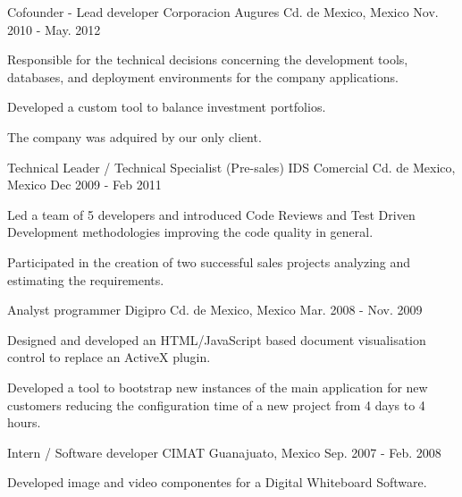 \begin{cventries}
  \cventry
    {Cofounder - Lead developer} %
    {Corporacion Augures} %
    {Cd. de Mexico, Mexico} %
    {Nov. 2010 - May. 2012} %
    {}
    {
      \begin{cvitems} %
        \item {Responsible for the technical decisions concerning the development tools, databases, and deployment environments for the company applications.}
        \item {Developed a custom tool to balance investment portfolios.}
        \item {The company was adquired by our only client.}
      \end{cvitems}
    }

  \cventry
    {Technical Leader / Technical Specialist (Pre-sales)} %
    {IDS Comercial} %
    {Cd. de Mexico, Mexico} %
    {Dec 2009 - Feb 2011} %
    {}
    {
      \begin{cvitems} %
        \item {Led a team of 5 developers and introduced Code Reviews and Test Driven Development methodologies improving the code quality in
        general.}
        \item {Participated in the creation of two successful sales projects analyzing and estimating the requirements.}
      \end{cvitems}
    }
  \cventry
    {Analyst programmer} %
    {Digipro} %
    {Cd. de Mexico, Mexico} %
    {Mar. 2008 - Nov. 2009} %
    {}
    {
      \begin{cvitems} %
        \item {Designed and developed an HTML/JavaScript based document visualisation control to replace an ActiveX plugin.}
        \item {Developed a tool to bootstrap new instances of the main application for new customers reducing the configuration time of a new project
        from 4 days to 4 hours.}
      \end{cvitems}
    }

  \cventry
    {Intern / Software developer} %
    {CIMAT} %
    {Guanajuato, Mexico} %
    {Sep. 2007 - Feb. 2008} %
    {}
    {
      \begin{cvitems} %
        \item {Developed image and video componentes for a Digital Whiteboard Software.}
      \end{cvitems}
    }

\end{cventries}
